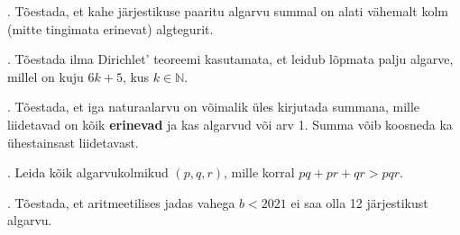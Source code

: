 \documentclass[a4paper, 10pt]{article}
\newcommand{\N}{\mathbb{N}}
\begin{document}
\bigskip

. Tõestada, et kahe järjestikuse paaritu algarvu summal on alati vähemalt kolm (mitte tingimata erinevat) algtegurit. 

\bigskip

. T\~oestada ilma Dirichlet' teoreemi kasutamata, et leidub l\~opmata palju algarve, millel on kuju $6k+5$, kus $k\in \N$. 

\bigskip

. Tõestada, et iga naturaalarvu on võimalik üles kirjutada summana, mille liidetavad on kõik {\bf erinevad} ja kas algarvud või arv 1. Summa võib koosneda ka ühestainsast liidetavast. 

\bigskip

. Leida kõik algarvukolmikud $(p,q,r)$, mille korral $pq + pr + qr > pqr$. 

\bigskip

. Tõestada, et aritmeetilises jadas vahega $b<2021$ ei saa olla 12 järjestikust algarvu. 

\bigskip
\end{document}
